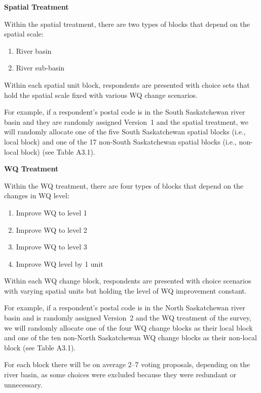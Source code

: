 \documentclass[12pt]{article}
\begin{document}
\noindent\textbf{Spatial Treatment}

Within the spatial treatment, there are two types of blocks that depend on the spatial scale:
\begin{enumerate}
    \item River basin
    \item River sub-basin
\end{enumerate}


Within each spatial unit block, respondents are presented with choice sets that hold the spatial scale fixed with various WQ change scenarios. 

For example, if a respondent’s postal code is in the South Saskatchewan river basin and they are randomly assigned Version~1 and the spatial 
treatment, we will randomly allocate one of the five South Saskatchewan spatial blocks (i.e., local block) and one of the 17 non-South 
Saskatchewan spatial blocks (i.e., non-local block) (see Table A3.1).

\noindent\textbf{WQ Treatment}

Within the WQ treatment, there are four types of blocks that depend on the changes in WQ level:
\begin{enumerate}
    \item Improve WQ to level 1
    \item Improve WQ to level 2
    \item Improve WQ to level 3
    \item Improve WQ level by 1 unit
\end{enumerate}

Within each WQ change block, respondents are presented with choice scenarios with varying spatial units but holding the level of WQ 
improvement constant.

For example, if a respondent’s postal code is in the North Saskatchewan river basin and is randomly assigned Version~2 and the 
WQ treatment of the survey, we will randomly allocate one of the four WQ change blocks as their local block and one of the ten non-North 
Saskatchewan WQ change blocks as their non-local block (see Table A3.1).


For each block there will be on average 2--7 voting proposals, depending on the river basin, as some choices were excluded because they
were redundant or unnecessary.
\end{document}
